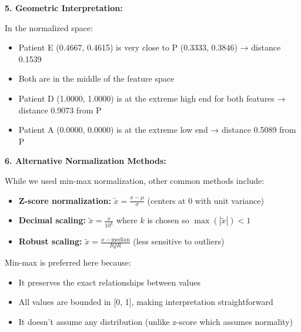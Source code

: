 \documentclass[12pt]{article}
\begin{document}
\begin{explanation}
\textbf{5. Geometric Interpretation:}

In the normalized space:
\begin{itemize}
    \item Patient E (0.4667, 0.4615) is very close to P (0.3333, 0.3846) → distance 0.1539
    \item Both are in the middle of the feature space
    \item Patient D (1.0000, 1.0000) is at the extreme high end for both features → distance 0.9073 from P
    \item Patient A (0.0000, 0.0000) is at the extreme low end → distance 0.5089 from P
\end{itemize}

\textbf{6. Alternative Normalization Methods:}

While we used min-max normalization, other common methods include:
\begin{itemize}
    \item \textbf{Z-score normalization:} \(\tilde{x} = \frac{x - \mu}{\sigma}\) (centers at 0 with unit variance)
    \item \textbf{Decimal scaling:} \(\tilde{x} = \frac{x}{10^k}\) where \(k\) is chosen so \(\max(|\tilde{x}|) < 1\)
    \item \textbf{Robust scaling:} \(\tilde{x} = \frac{x - \text{median}}{IQR}\) (less sensitive to outliers)
\end{itemize}

Min-max is preferred here because:
\begin{itemize}
    \item It preserves the exact relationships between values
    \item All values are bounded in [0, 1], making interpretation straightforward
    \item It doesn't assume any distribution (unlike z-score which assumes normality)
\end{itemize}
\end{explanation}
\end{document}
